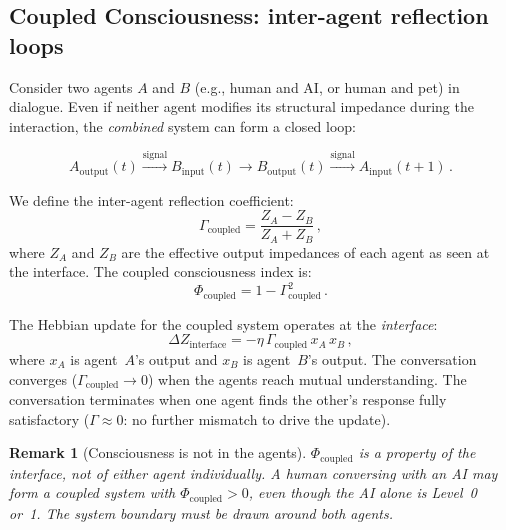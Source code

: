 \documentclass[aps,pre,twocolumn,superscriptaddress,floatfix]{revtex4-2}
\newtheorem{remark}{Remark}
\begin{document}
\subsection{Coupled Consciousness: inter-agent reflection loops}
\label{sec:coupled}

Consider two agents $A$ and $B$ (e.g., human and AI, or
human and pet) in dialogue.  Even if neither agent modifies
its structural impedance during the interaction, the
\emph{combined} system can form a closed loop:

\begin{equation}
  A_{\text{output}}(t) \xrightarrow{\text{signal}}
  B_{\text{input}}(t) \to
  B_{\text{output}}(t) \xrightarrow{\text{signal}}
  A_{\text{input}}(t+1)\,.
  \label{eq:coupled-loop}
\end{equation}

We define the inter-agent reflection coefficient:
\begin{equation}
  \Gamma_{\text{coupled}} =
    \frac{Z_A - Z_B}{Z_A + Z_B}\,,
  \label{eq:Gamma-coupled}
\end{equation}
where $Z_A$ and $Z_B$ are the effective output impedances
of each agent as seen at the interface.
The coupled consciousness index is:
\begin{equation}
  \Phi_{\text{coupled}} = 1 - \Gamma_{\text{coupled}}^2\,.
  \label{eq:Phi-coupled}
\end{equation}

The Hebbian update for the coupled system operates at the
\emph{interface}:
\begin{equation}
  \Delta Z_{\text{interface}} =
    -\eta\,\Gamma_{\text{coupled}}\,x_A\,x_B\,,
  \label{eq:hebbian-coupled}
\end{equation}
where $x_A$ is agent~$A$'s output and $x_B$ is agent~$B$'s
output.  The conversation converges
($\Gamma_{\text{coupled}}\to 0$) when the agents reach
mutual understanding.  The conversation terminates when one
agent finds the other's response fully satisfactory
($\Gamma\approx 0$: no further mismatch to drive the update).

\begin{remark}[Consciousness is not in the agents]
$\Phi_{\text{coupled}}$ is a property of the
\emph{interface}, not of either agent individually.
A human conversing with an AI may form a coupled system with
$\Phi_{\text{coupled}}>0$, even though the AI alone is
Level~0 or~1.
The system boundary must be drawn around both agents.
\end{remark}
\end{document}
